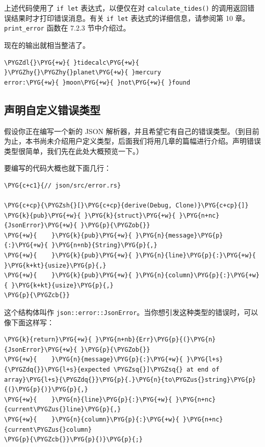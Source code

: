上述代码使用了 \texttt{if let} 表达式，以便仅在对 \texttt{calculate\_tides()} 的调用返回错误结果时才打印错误消息。有关 \texttt{if let} 表达式的详细信息，请参阅第 10 章。\texttt{print\_error} 函数在 7.2.3 节中介绍过。

现在的输出就相当整洁了。

\begin{Verbatim}[commandchars=\\\{\},breaklines=true,breakanywhere=true,fontsize=\codefont,xleftmargin=17bp]
\PYGZdl{}\PYG{+w}{ }tidecalc\PYG{+w}{ }\PYGZhy{}\PYGZhy{}planet\PYG{+w}{ }mercury
error:\PYG{+w}{ }moon\PYG{+w}{ }not\PYG{+w}{ }found
\end{Verbatim}

\subsection{声明自定义错误类型}

假设你正在编写一个新的 JSON 解析器，并且希望它有自己的错误类型。（到目前为止，本书尚未介绍用户定义类型，后面我们将用几章的篇幅进行介绍。声明错误类型很简单，我们先在此处大概预览一下。）

要编写的代码大概也就下面几行：

\begin{Verbatim}[commandchars=\\\{\},breaklines=true,breakanywhere=true,fontsize=\codefont,xleftmargin=17bp]
\PYG{c+c1}{// json/src/error.rs}

\PYG{c+cp}{\PYGZsh{}[}\PYG{c+cp}{derive(Debug, Clone)}\PYG{c+cp}{]}
\PYG{k}{pub}\PYG{+w}{ }\PYG{k}{struct}\PYG{+w}{ }\PYG{n+nc}{JsonError}\PYG{+w}{ }\PYG{p}{\PYGZob{}}
\PYG{+w}{    }\PYG{k}{pub}\PYG{+w}{ }\PYG{n}{message}\PYG{p}{:}\PYG{+w}{ }\PYG{n+nb}{String}\PYG{p}{,}
\PYG{+w}{    }\PYG{k}{pub}\PYG{+w}{ }\PYG{n}{line}\PYG{p}{:}\PYG{+w}{ }\PYG{k+kt}{usize}\PYG{p}{,}
\PYG{+w}{    }\PYG{k}{pub}\PYG{+w}{ }\PYG{n}{column}\PYG{p}{:}\PYG{+w}{ }\PYG{k+kt}{usize}\PYG{p}{,}
\PYG{p}{\PYGZcb{}}
\end{Verbatim}

这个结构体叫作 \texttt{json::error::JsonError}。当你想引发这种类型的错误时，可以像下面这样写：

\begin{Verbatim}[commandchars=\\\{\},breaklines=true,breakanywhere=true,fontsize=\codefont,xleftmargin=17bp]
\PYG{k}{return}\PYG{+w}{ }\PYG{n+nb}{Err}\PYG{p}{(}\PYG{n}{JsonError}\PYG{+w}{ }\PYG{p}{\PYGZob{}}
\PYG{+w}{    }\PYG{n}{message}\PYG{p}{:}\PYG{+w}{ }\PYG{l+s}{\PYGZdq{}}\PYG{l+s}{expected \PYGZsq{}]\PYGZsq{} at end of array}\PYG{l+s}{\PYGZdq{}}\PYG{p}{.}\PYG{n}{to\PYGZus{}string}\PYG{p}{(}\PYG{p}{)}\PYG{p}{,}
\PYG{+w}{    }\PYG{n}{line}\PYG{p}{:}\PYG{+w}{ }\PYG{n+nc}{current\PYGZus{}line}\PYG{p}{,}
\PYG{+w}{    }\PYG{n}{column}\PYG{p}{:}\PYG{+w}{ }\PYG{n+nc}{current\PYGZus{}column}
\PYG{p}{\PYGZcb{}}\PYG{p}{)}\PYG{p}{;}
\end{Verbatim}

